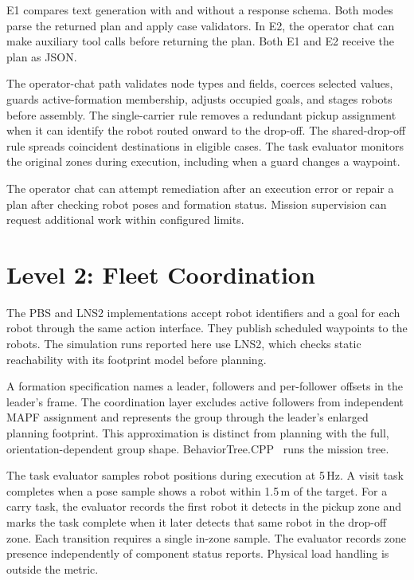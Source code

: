 \documentclass[pdflatex,sn-mathphys-num]{sn-jnl}
\begin{document}
E1 compares text generation with and without a response schema. Both modes
parse the returned plan and apply case validators. In E2, the operator chat
can make auxiliary tool calls before returning the plan. Both E1 and E2
receive the plan as JSON.

The operator-chat path validates node types and fields, coerces selected
values, guards active-formation membership, adjusts occupied goals, and
stages robots before assembly. The single-carrier rule removes a redundant
pickup assignment when it can identify the robot routed onward to the
drop-off. The shared-drop-off rule spreads coincident destinations in
eligible cases. The task evaluator monitors the original zones during
execution, including when a guard changes a waypoint.

The operator chat can attempt remediation after an execution error or repair
a plan after checking robot poses and formation status. Mission supervision
can request additional work within configured limits.

\section{Level 2: Fleet Coordination}

The PBS and LNS2 implementations accept robot identifiers and a goal for
each robot through the same action interface. They publish scheduled
waypoints to the robots. The simulation runs reported here use LNS2, which
checks static reachability with its footprint model before planning.

A formation specification names a leader, followers and per-follower
offsets in the leader's frame. The coordination layer excludes active
followers from independent MAPF assignment and represents the group through
the leader's enlarged planning footprint. This approximation is distinct
from planning with the full, orientation-dependent group shape.
BehaviorTree.CPP~\citep{btcpp} runs the mission tree.

The task evaluator samples robot positions during execution at 5\,Hz. A visit
task completes when a pose sample shows a robot within 1.5\,m of the target.
For a carry task, the evaluator records the first robot it detects in the
pickup zone and marks the task complete when it later detects that same
robot in the drop-off zone. Each transition requires a single in-zone
sample. The evaluator records zone presence independently of component
status reports. Physical load handling is outside the metric.
\end{document}
